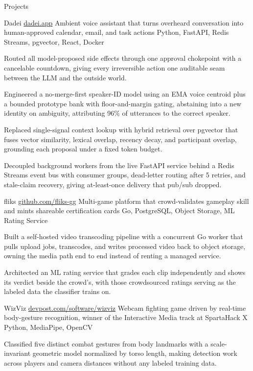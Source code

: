\documentclass[
	11pt
]{../../../template}
\begin{document}
	\begin{rSection}{P}{rojects}
		\begin{rSectionEntry}
			{Dadei}
			{\href{https://dadei.app}{dadei.app}}
			{Ambient voice assistant that turns overheard conversation into human-approved calendar, email, and task actions}
			{Python, FastAPI, Redis Streams, pgvector, React, Docker}
			{}

			\item Routed all model-proposed side effects through one approval chokepoint with a cancelable countdown, giving every irreversible action one auditable seam between the LLM and the outside world.
			\item Engineered a no-merge-first speaker-ID model using an EMA voice centroid plus a bounded prototype bank with floor-and-margin gating, abstaining into a new identity on ambiguity, attributing 96\% of utterances to the correct speaker.
			\item Replaced single-signal context lookup with hybrid retrieval over pgvector that fuses vector similarity, lexical overlap, recency decay, and participant overlap, grounding each proposal under a fixed token budget.
			\item Decoupled background workers from the live FastAPI service behind a Redis Streams event bus with consumer groups, dead-letter routing after 5 retries, and stale-claim recovery, giving at-least-once delivery that pub/sub dropped.
		\end{rSectionEntry}

		\begin{rSectionEntry}
			{fliks}
			{\href{https://github.com/fliks-gg}{github.com/fliks-gg}}
			{Multi-game platform that crowd-validates gameplay skill and mints shareable certification cards}
			{Go, PostgreSQL, Object Storage, ML Rating Service}
			{}

			\item Built a self-hosted video transcoding pipeline with a concurrent Go worker that pulls upload jobs, transcodes, and writes processed video back to object storage, owning the media path end to end instead of renting a managed service.
			\item Architected an ML rating service that grades each clip independently and shows its verdict beside the crowd's, with those crowdsourced ratings serving as the labeled data the classifier trains on.
		\end{rSectionEntry}

		\begin{rSectionEntry}
			{WizViz}
			{\href{https://devpost.com/software/wizviz}{devpost.com/software/wizviz}}
			{Webcam fighting game driven by real-time body-gesture recognition, winner of the Interactive Media track at SpartaHack X}
			{Python, MediaPipe, OpenCV}
			{}

			\item Classified five distinct combat gestures from body landmarks with a scale-invariant geometric model normalized by torso length, making detection work across players and camera distances without any labeled training data.
		\end{rSectionEntry}
	\end{rSection}
\end{document}
